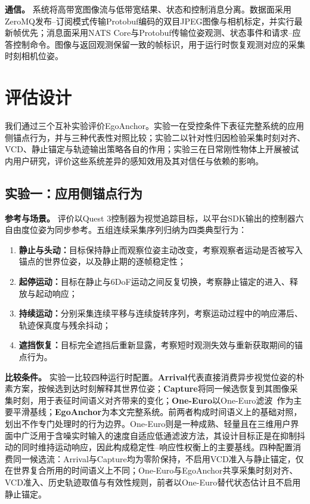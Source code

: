 \documentclass[review]{vgtc}
\begin{document}
\textbf{通信。}
系统将高带宽图像流与低带宽结果、状态和控制消息分离。数据面采用ZeroMQ发布--订阅模式传输Protobuf编码的双目JPEG图像与相机标定，并实行最新帧优先；消息面采用NATS Core与Protobuf传输位姿观测、状态事件和请求--应答控制命令。图像与返回观测保留一致的帧标识，用于运行时恢复观测对应的采集时刻相机位姿。

\section{评估设计}\label{sec:evaluation}

我们通过三个互补实验评价EgoAnchor。实验一在受控条件下表征完整系统的应用侧锚点行为，并与三种代表性对照比较；实验二以针对性归因检验采集时刻对齐、VCD、静止锚定与轨迹输出策略各自的作用；实验三在日常刚性物体上开展被试内用户研究，评价这些系统差异的感知效用及其对信任与依赖的影响。

\subsection{实验一：应用侧锚点行为}\label{sec:exp1-design}

\textbf{参考与场景。}
评价以Quest 3控制器为视觉追踪目标，以平台SDK输出的控制器六自由度位姿为同步参考。五组连续采集序列归纳为四类典型行为：
\begin{enumerate}
  \item \textbf{静止与头动：}目标保持静止而观察位姿主动改变，考察观察者运动是否被写入锚点的世界位姿，以及静止期的逐帧稳定性；
  \item \textbf{起停运动：}目标在静止与6DoF运动之间反复切换，考察静止锚定的进入、释放与起动响应；
  \item \textbf{持续运动：}分别采集连续平移与连续旋转序列，考察运动过程中的响应滞后、轨迹保真度与残余抖动；
  \item \textbf{遮挡恢复：}目标完全遮挡后重新显露，考察短时观测失效与重新获取期间的锚点行为。
\end{enumerate}

\textbf{比较条件。}
实验一比较四种运行时配置。\textbf{Arrival}代表直接消费异步视觉位姿的朴素方案，按候选到达时刻解释其世界位姿；\textbf{Capture}将同一候选恢复到其图像采集时刻，用于表征时间语义对齐带来的变化；\textbf{One-Euro}以One-Euro滤波~\cite{casiez2012oneeuro}作为主要平滑基线；\textbf{EgoAnchor}为本文完整系统。前两者构成时间语义上的基础对照，划出不作专门处理时的行为边界。One-Euro则是一种成熟、轻量且在三维用户界面中广泛用于含噪实时输入的速度自适应低通滤波方法，其设计目标正是在抑制抖动的同时维持运动响应，因此构成稳定性--响应性权衡上的主要基线。四种配置消费同一候选流：Arrival与Capture均为零阶保持，不启用VCD准入与静止锚定，仅在世界复合所用的时间语义上不同；One-Euro与EgoAnchor共享采集时刻对齐、VCD准入、历史轨迹取值与有效性规则，前者以One-Euro替代状态估计且不启用静止锚定。
\end{document}
